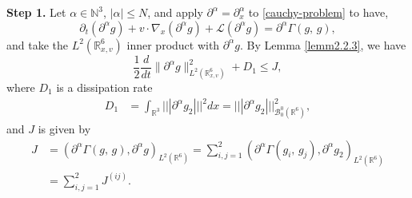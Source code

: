 \documentclass{amsart}[12pt, article]
\begin{document}
\noindent
{\bf Step 1.}
 Let $\alpha\in{{\mathbb N}}^3$, $|\alpha|\le N$, and apply ${{\partial}}^\alpha={{\partial}}^\alpha_x$ to \eqref{cauchy-problem} to have,
\begin{equation*}
{{\partial}}_t({{\partial}}^\alpha g)+ v\cdot\nabla_x ({{\partial}}^\alpha g)
+ {{\mathcal L}}({{\partial}}^\alpha g)={{\partial}}^\alpha\Gamma(g,\,
g),
\end{equation*}
and take the $L^2({{{\mathbb R}}}^6_{x, v})$ inner product with ${{\partial}}^\alpha g$. By Lemma \ref{lemm2.2.3}, we have
\begin{equation}\label{microenergy1}
\frac 12 \frac{d}{dt}\|{{\partial}}^\alpha g\|^2_{L^2({{{\mathbb R}}}^6_{x, v})}
+D_1\le J,
\end{equation}
where $D_1$ is a dissipation rate
\begin{align*}
D_1&=\int_{{{{\mathbb R}}}^3}||| {{\partial}}^\alpha g_2 |||^2dx=||| {{\partial}}^\alpha g_2 |||^2_{{{\mathcal B}}^0_0({{{\mathbb R}}}^6)},
\end{align*}
and $J$ is given by
\begin{align*}
J&=({{\partial}}^\alpha\Gamma(g,\,g), {{\partial}}^\alpha g)_{L^2({{{\mathbb R}}}^6)}
=\sum_{i,j=1}^2({{\partial}}^\alpha\Gamma(g_i,\,g_j), {{\partial}}^\alpha g_2)_{L^2({{{\mathbb R}}}^6)}
\\&=\sum_{i,j=1}^2 J^{(ij)}.
\end{align*}
\end{document}
